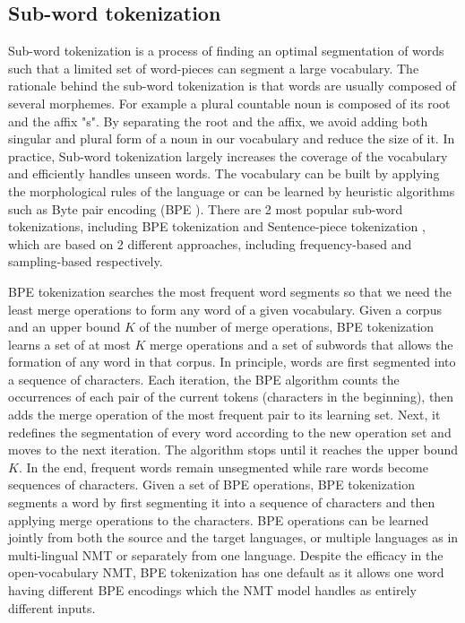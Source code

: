 \subsection{Sub-word tokenization}
Sub-word tokenization is a process of finding an optimal segmentation of words such that a limited set of word-pieces can segment a large vocabulary. The rationale behind the sub-word tokenization is that words are usually composed of several morphemes. For example a plural countable noun is composed of its root and the affix "s". By separating the root and the affix, we avoid adding both singular and plural form of a noun in our vocabulary and reduce the size of it. In practice, Sub-word tokenization largely increases the coverage of the vocabulary and efficiently handles unseen words. The vocabulary can be built by applying the morphological rules of the language or can be learned by heuristic algorithms such
as Byte pair encoding (BPE )\citep{Sennrich16neural,Mike12japanese,Gage94anew}. There are 2 most popular sub-word tokenizations, including BPE tokenization \citep{Sennrich16neural,Mike12japanese,Gage94anew} and Sentence-piece tokenization \citep{Taku18subword}, which are based on 2 different approaches, including frequency-based and sampling-based respectively.

BPE tokenization searches the most frequent word segments so that we need the least merge operations to form any word of a given vocabulary. Given a corpus and an upper bound $K$ of the number of merge operations, BPE tokenization learns a set of at most $K$ merge operations and a set of subwords that allows the formation of any word in that corpus. In principle, words are first segmented into a sequence of characters. Each iteration, the BPE algorithm counts the occurrences of each pair of the current tokens (characters in the beginning), then adds the merge operation of the most frequent pair to its learning set. Next, it redefines the segmentation of every word according to the new operation set and moves to the next iteration. The algorithm stops until it reaches the upper bound $K$. In the end, frequent words remain unsegmented while rare words become sequences of characters. Given a set of BPE operations, BPE tokenization segments a word by first segmenting it into a sequence of characters and then applying merge operations to the characters. BPE operations can be learned jointly from both the source and the target languages, or multiple languages as in multi-lingual NMT or separately from one language. Despite the efficacy in the open-vocabulary NMT, BPE tokenization has one default as it allows one word having different BPE encodings \citep{Taku18subword} which the NMT model handles as entirely different inputs.

